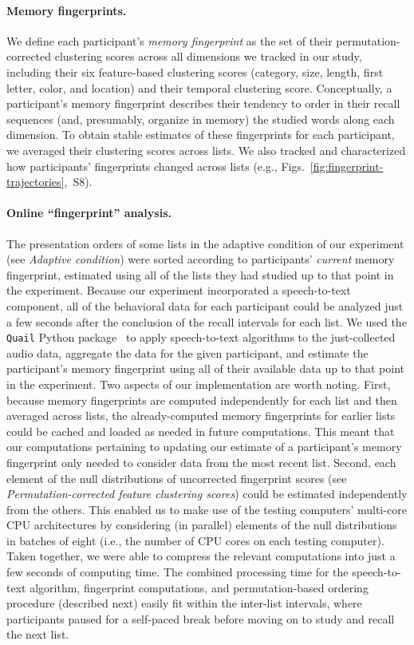 \documentclass[11pt]{article}
\newcommand{\fingerprintTrajectoryRandom}{S8}
\begin{document}
\paragraph*{Memory fingerprints.}

We define each participant's \textit{memory fingerprint} as the set of their
permutation-corrected clustering scores across all dimensions we tracked in our
study, including their six feature-based clustering scores (category, size,
length, first letter, color, and location) and their temporal clustering score.
Conceptually, a participant's memory fingerprint describes their tendency to
order in their recall sequences (and, presumably, organize in memory) the
studied words along each dimension. To obtain stable estimates of these
fingerprints for each participant, we averaged their clustering scores across
lists. We also tracked and characterized how participants' fingerprints changed
across lists (e.g.,
Figs.~\ref{fig:fingerprint-trajectories},~\fingerprintTrajectoryRandom).

\paragraph{Online ``fingerprint'' analysis.}

The presentation orders of some lists in the adaptive condition of our
experiment (see \textit{Adaptive condition}) were sorted according to
participants' \textit{current} memory fingerprint, estimated using all of the
lists they had studied up to that point in the experiment. Because our
experiment incorporated a speech-to-text component, all of the behavioral data
for each participant could be analyzed just a few seconds after the conclusion
of the recall intervals for each list. We used the \texttt{Quail} Python
package~\citep{HeusEtal17} to apply speech-to-text algorithms to the
just-collected audio data, aggregate the data for the given participant, and estimate
the participant's memory fingerprint using all of their available data up to
that point in the experiment. Two aspects of our implementation are worth
noting. First, because memory fingerprints are computed independently for each
list and then averaged across lists, the already-computed memory fingerprints
for earlier lists could be cached and loaded as needed in future computations.
This meant that our computations pertaining to updating our estimate of a
participant's memory fingerprint only needed to consider data from the most
recent list. Second, each element of the null distributions of uncorrected
fingerprint scores (see \textit{Permutation-corrected feature clustering
scores}) could be estimated independently from the others. This enabled us to
make use of the testing computers' multi-core CPU architectures by considering
(in parallel) elements of the null distributions in batches of eight (i.e., the
number of CPU cores on each testing computer). Taken together, we were able to
compress the relevant computations into just a few seconds of computing time.
The combined processing time for the speech-to-text algorithm, fingerprint
computations, and permutation-based ordering procedure (described next) easily
fit within the inter-list intervals, where participants paused for a self-paced
break before moving on to study and recall the next list.
\end{document}
